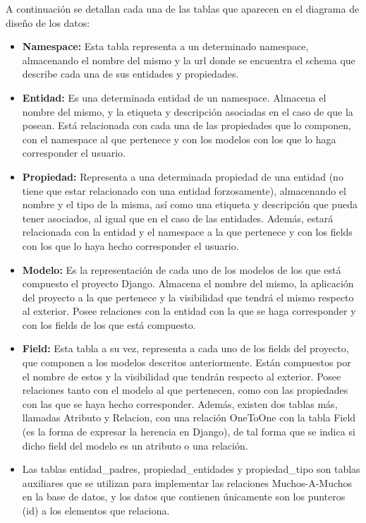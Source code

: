 A continuación se detallan cada una de las tablas que aparecen en el diagrama de
diseño de los datos:
\begin{itemize}
    \item \textbf{Namespace:} Esta tabla representa a un determinado namespace,
        almacenando el nombre del mismo y la url donde se encuentra el schema
        que describe cada una de sus entidades y propiedades.
    \item \textbf{Entidad:} Es una determinada entidad de un namespace.
        Almacena el nombre del mismo, y la etiqueta y descripción asociadas en
        el caso de que la posean. Está relacionada con cada una de las
        propiedades que lo componen, con el namespace al que pertenece y con los
        modelos con los que lo haga corresponder el usuario.
    \item \textbf{Propiedad:} Representa a una determinada propiedad de una
        entidad (no tiene que estar relacionado con una entidad forzosamente),
        almacenando el nombre y el tipo de la misma, así como una etiqueta y
        descripción que pueda tener asociados, al igual que en el caso de las
        entidades. Además, estará relacionada con la entidad y el namespace a la
        que pertenece y con los fields con los que lo haya hecho corresponder el
        usuario.
    \item \textbf{Modelo:} Es la representación de cada uno de los modelos de
        los que está compuesto el proyecto Django. Almacena el nombre del mismo,
        la aplicación del proyecto a la que pertenece y la visibilidad que
        tendrá el mismo respecto al exterior. Posee relaciones con la entidad
        con la que se haga corresponder y con los fields de los que está
        compuesto.
    \item \textbf{Field:} Esta tabla a su vez, representa a cada uno de los
        fields del proyecto, que componen a los modelos descritos anteriormente.
        Están compuestos por el nombre de estos y la visibilidad que tendrán
        respecto al exterior. Posee relaciones tanto con el modelo al que
        pertenecen, como con las propiedades con las que se haya hecho
        corresponder. Además, existen dos tablas más, llamadas Atributo y
        Relacion, con una relación OneToOne con la tabla Field (es la forma de
        expresar la herencia en Django), de tal forma que se indica si dicho
        field del modelo es un atributo o una relación.
    \item Las tablas entidad\_padres, propiedad\_entidades y propiedad\_tipo son
        tablas auxiliares que se utilizan para implementar las relaciones
        Muchos-A-Muchos en la base de datos, y los datos que contienen
        únicamente son los punteros (id) a los elementos que relaciona.
\end{itemize}

